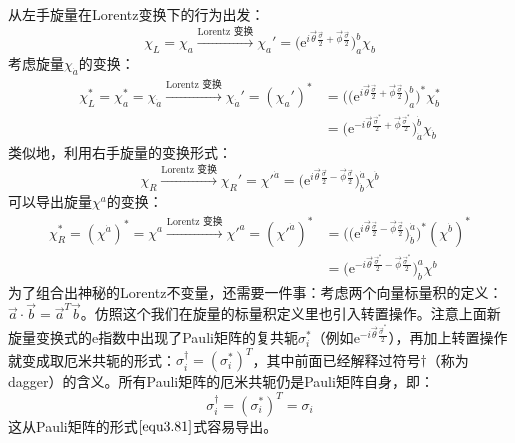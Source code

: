 从左手旋量在Lorentz变换下的行为出发：
\begin{equation}
\label{equ3.201}
	\chi_L = \chi_a \stackrel{\text{Lorentz 变换}}{\longrightarrow} \chi_a' = \Big( \mathrm{e}^{ i\vec{\theta} \frac{\vec{\sigma}}{2} + \vec{\phi} \frac{\vec{\sigma}}{2}  } \Big)^b_a \chi_b
\end{equation}
考虑旋量$\chi_{\dot{a}}$的变换：
\begin{align}
	\chi_L^* = \chi_a^* = \chi_{\dot{a}} \stackrel{\text{Lorentz 变换}}{\longrightarrow} \chi_{\dot{a}}' = (\chi_a')^* &= \bigg( \Big( \mathrm{e}^{ i\vec{\theta} \frac{\vec{\sigma}}{2} + \vec{\phi} \frac{\vec{\sigma}}{2}  } \Big)^b_a \bigg)^* \chi_b^* \nonumber \\
\label{equ3.202}
	&= \bigg( \mathrm{e}^{-i \vec{\theta} \frac{\vec{\sigma}^*}{2} + \vec{\phi} \frac{\vec{\sigma}^*}{2} } \bigg)^{\dot{b}}_{\dot{a}} \chi_{\dot{b}}
\end{align}
类似地，利用右手旋量的变换形式：
\begin{equation}
\label{equ3.203}
	\chi_R \stackrel{\text{Lorentz 变换}}{\longrightarrow} \chi_R' = \chi'^{\dot{a}} = \Big( \mathrm{e}^{ i\vec{\theta} \frac{\vec{\sigma}}{2}- \vec{\phi} \frac{\vec{\sigma}}{2} } \Big)^{\dot{a}}_{\dot{b}} \chi^{\dot{b}}
\end{equation}
可以导出旋量$\chi^a$的变换：
\begin{align}
	\chi_R^* = (\chi^{\dot{a}})^* = \chi^a \stackrel{\text{Lorentz 变换}}{\longrightarrow} \chi'^a = (\chi'^{\dot{a}})^* &= \bigg( \Big( \mathrm{e}^{ i\vec{\theta} \frac{\vec{\sigma}}{2} - \vec{\phi} \frac{\vec{\sigma}}{2} } \Big)^{\dot{a}}_{\dot{b}} \bigg)^* (\chi^{\dot{b}})^* \nonumber \\
\label{equ3.204}
	&= \bigg( \mathrm{e}^{-i \vec{\theta} \frac{\vec{\sigma}^*}{2} - \vec{\phi} \frac{\vec{\sigma}^*}{2} } \bigg)^{a}_{b} \chi^b
\end{align}
为了组合出神秘的Lorentz不变量，还需要一件事：考虑两个向量标量积的定义：$\vec{a} \cdot \vec{b} = \vec{a}^T \vec{b}$。仿照这个我们在旋量的标量积定义里也引入转置操作。注意上面新旋量变换式的$\mathrm{e}$指数中出现了Pauli矩阵的复共轭$\sigma_i^*$（例如$\mathrm{e}^{ -i \vec{\theta} \frac{\vec{\sigma}^*}{2} }$），再加上转置操作就变成取厄米共轭的形式：$\sigma_i^\dag = (\sigma_i^*)^T$，其中前面已经解释过符号$\dag$（称为dagger）的含义。所有Pauli矩阵的厄米共轭仍是Pauli矩阵自身，即：
\begin{equation}
\label{equ3.205}
	\sigma_i^\dag = (\sigma_i^*)^T = \sigma_i
\end{equation}
这从Pauli矩阵的形式$\eqref{equ3.81}$式容易导出。

